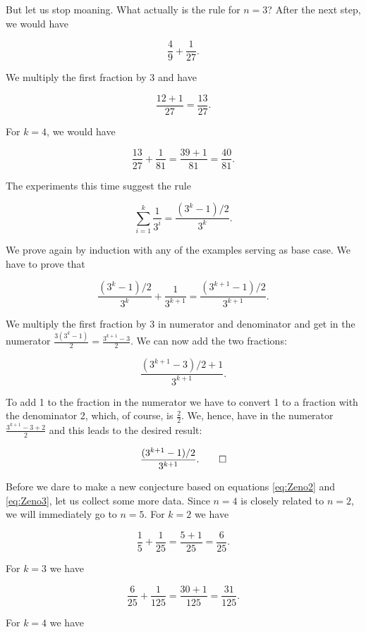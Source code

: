 \documentclass[tikz]{scrreprt}
\begin{document}
But let us stop moaning. What actually is the rule
for $n=3$? After the next step, we would have

\[
\frac{4}{9} + \frac{1}{27}.
\] 

We multiply the first fraction by 3 and have

\[
\frac{12+1}{27} =
\frac{13}{27}.
\] 

For $k=4$, we would have

\[
\frac{13}{27} + \frac{1}{81} =
\frac{39 + 1}{81} =  \frac{40}{81}.
\] 

The experiments this time suggest the rule

\begin{equation}\label{eq:Zeno3}
\sum_{i=1}^k{\frac{1}{3^i}} = 
\frac{(3^k - 1) / 2}{3^k}.
\end{equation}

We prove again by induction with any of the examples
serving as base case.
We have to prove that 

\begin{equation}
\frac{(3^k - 1) / 2}{3^k} + \frac{1}{3^{k+1}} =
\frac{(3^{k+1} - 1) / 2}{3^{k+1}}.
\end{equation}

We multiply the first fraction by 3 in numerator and
denominator and get in the numerator
$\frac{3(3^k - 1)}{2} = \frac{3^{k+1} - 3}{2}$. 
We can now add the two fractions:

\[
\frac{(3^{k+1} - 3) / 2 + 1}{3^{k+1}}.
\]

To add 1 to the fraction in the numerator
we have to convert 1 to a fraction with the denominator 2,
which, of course, is $\frac{2}{2}$.
We, hence, have in the numerator
$\frac{3^{k+1} - 3 + 2}{2}$
and this leads to the desired result:

\begin{equation}
\frac{(3^{k+1} - 1) / 2}{3^{k+1}}.\qed
\end{equation}

Before we dare to make a new conjecture
based on equations \ref{eq:Zeno2} and \ref{eq:Zeno3},
let us collect some more data.
Since $n=4$ is closely related to $n=2$,
we will immediately go to $n=5$.
For $k=2$ we have

\[
\frac{1}{5} + \frac{1}{25} =
\frac{5 + 1}{25} = \frac{6}{25}.
\]

For $k=3$ we have

\[
\frac{6}{25} + \frac{1}{125} =
\frac{30+1}{125} = \frac{31}{125}.
\]

For $k=4$ we have
\end{document}
